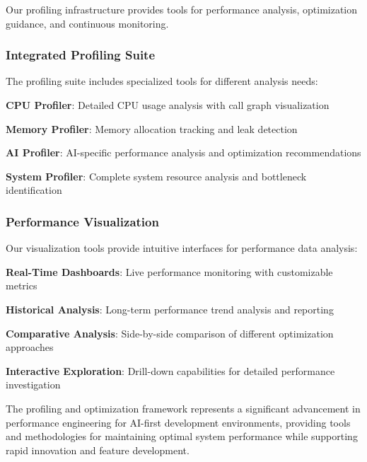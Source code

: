 Our profiling infrastructure provides tools for performance analysis, optimization guidance, and continuous monitoring.

\subsubsection*{Integrated Profiling Suite}

The profiling suite includes specialized tools for different analysis needs:

\begin{expandedlist}
    \item \textbf{CPU Profiler}: Detailed CPU usage analysis with call graph visualization
    \item \textbf{Memory Profiler}: Memory allocation tracking and leak detection
    \item \textbf{AI Profiler}: AI-specific performance analysis and optimization recommendations
    \item \textbf{System Profiler}: Complete system resource analysis and bottleneck identification
\end{expandedlist}

\subsubsection*{Performance Visualization}

Our visualization tools provide intuitive interfaces for performance data analysis:

\begin{compactlist}
    \item \textbf{Real-Time Dashboards}: Live performance monitoring with customizable metrics
    \item \textbf{Historical Analysis}: Long-term performance trend analysis and reporting
    \item \textbf{Comparative Analysis}: Side-by-side comparison of different optimization approaches
    \item \textbf{Interactive Exploration}: Drill-down capabilities for detailed performance investigation
\end{compactlist}

The profiling and optimization framework represents a significant advancement in performance engineering for AI-first development environments, providing tools and methodologies for maintaining optimal system performance while supporting rapid innovation and feature development.
